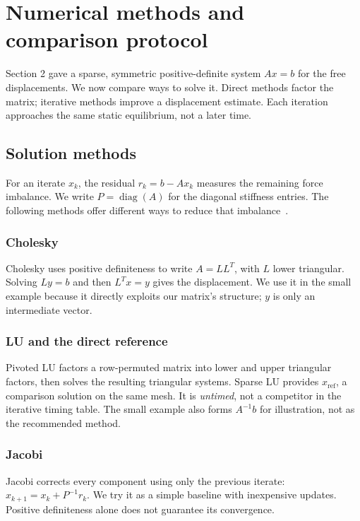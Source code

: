 \section{Numerical methods and comparison protocol}
\label{sec:solvers-protocol}

Section 2 gave a sparse, symmetric positive-definite system $Ax=b$ for
the free displacements. We now compare ways to solve it. Direct methods
factor the matrix; iterative methods improve a displacement estimate.
Each iteration approaches the same static equilibrium, not a later time.

\subsection{Solution methods}
For an iterate $x_k$, the residual $r_k=b-Ax_k$ measures the remaining
force imbalance. We write $P=\operatorname{diag}(A)$ for the diagonal
stiffness entries. The following methods offer different ways to reduce
that imbalance~\cite{saad-iterative}.

\subsubsection*{Cholesky}
Cholesky uses positive definiteness to write $A=LL^T$, with $L$ lower
triangular. Solving $Ly=b$ and then $L^Tx=y$ gives the displacement.
We use it in the small example because it directly exploits our matrix's
structure; $y$ is only an intermediate vector.

\subsubsection*{LU and the direct reference}
Pivoted LU factors a row-permuted matrix into lower and upper triangular
factors, then solves the resulting triangular systems. Sparse LU provides
$x_{\mathrm{ref}}$, a comparison solution on the same mesh. It is
\emph{untimed}, not a competitor in the iterative timing table. The small
example also forms $A^{-1}b$ for illustration, not as the recommended method.

\subsubsection*{Jacobi}
Jacobi corrects every component using only the previous iterate:
$x_{k+1}=x_k+P^{-1}r_k$. We try it as a simple baseline with inexpensive
updates. Positive definiteness alone does not guarantee its convergence.

